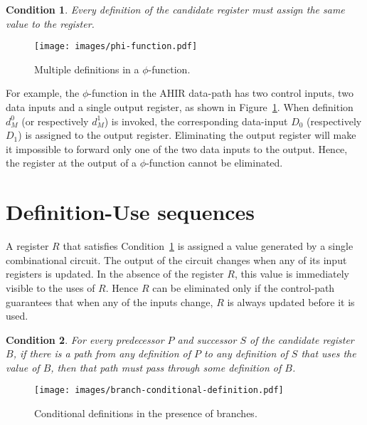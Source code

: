 \documentclass[a4paper,12pt]{article}
\newtheorem{condition}{Condition}
\begin{document}
\begin{condition}
  \label{condition:conditional-definitions}
  Every definition of the candidate register must assign the same
  value to the register.
\end{condition}

\begin{figure}[htb]
  \centering
  \texttt{[image: images/phi-function.pdf]}
  \caption{Multiple definitions in a $\phi$-function.}
  \label{fig:phi-function}
\end{figure}

For example, the $\phi$-function in the AHIR data-path has two control
inputs, two data inputs and a single output register, as shown in
Figure~\ref{fig:phi-function}. When definition $d^0_M$ (or
respectively $d^1_M$) is invoked, the corresponding data-input $D_0$
(respectively $D_1$) is assigned to the output register. Eliminating
the output register will make it impossible to forward only one of the
two data inputs to the output. Hence, the register at the output of a
$\phi$-function cannot be eliminated.

\section{Definition-Use sequences}
\label{sec:def-use-chains}

A register $R$ that satisfies
Condition~\ref{condition:conditional-definitions} is assigned a value
generated by a single combinational circuit. The output of the circuit
changes when any of its input registers is updated. In the absence of
the register $R$, this value is immediately visible to the uses of
$R$. Hence $R$ can be eliminated only if the control-path guarantees
that when any of the inputs change, $R$ is always updated before it is
used.

\begin{condition}
  \label{condition:def-use-chains}
  For every predecessor $P$ and successor $S$ of the candidate
  register $B$, if there is a path from any definition of $P$ to any
  definition of $S$ that uses the value of $B$, then that path must
  pass through some definition of $B$.
\end{condition}

\begin{figure}[htb]
  \centering
  \texttt{[image: images/branch-conditional-definition.pdf]}
  \caption{Conditional definitions in the presence of branches.}
  \label{fig:branch-conditional-definition}
\end{figure}
\end{document}
